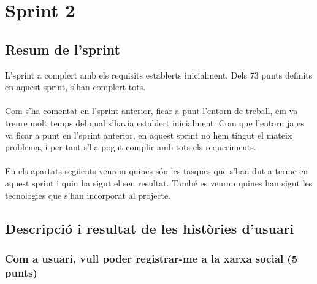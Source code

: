 \documentclass[11pt,catalan,listoffigures,listoftables]{tfgetsinf}
\begin{document}
\section{Sprint 2}

\subsection{Resum de l'sprint}

L'sprint a complert amb els requisits establerts inicialment. Dels 73 punts definits en aquest sprint, s'han complert tots.\\ \\
Com s'ha comentat en l'sprint anterior, ficar a punt l'entorn de treball, em va treure molt temps del qual s'havia establert inicialment. Com que l'entorn ja es va ficar a punt en l'sprint anterior, en aquest sprint no hem tingut el mateix problema, i per tant s'ha pogut complir amb tots els requeriments.\\ \\
En els apartats següents veurem quines són les tasques que s'han dut a terme en aquest sprint i quin ha sigut el seu resultat. També es veuran quines han sigut les tecnologies que s'han incorporat al projecte.

\subsection{Descripció i resultat de les històries d'usuari}

\subsubsection{Com a usuari, vull poder registrar-me a la xarxa social (5 punts)}
\end{document}
